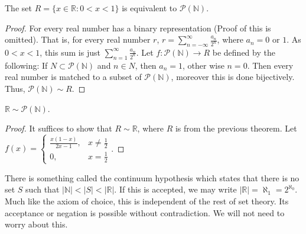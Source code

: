 \documentclass[crop=false,class=book]{standalone}
\begin{document}
\begin{theorem}
The set $R=\{x\in \mathbb{R}:0<x<1\}$ is equivalent to $\mathcal{P}(\mathbb{N})$.
\end{theorem}
\begin{proof}
For every real number has a binary representation (Proof of this is omitted). That is, for every real number $r$, $ r = \sum_{n=-\infty}^{\infty} \frac{a_n}{2^n}$, where $a_n = 0$ or $1$. As $0<x<1$, this sum is just $\sum_{n=1}^{\infty} \frac{a_n}{2^n}$. Let $f:\mathcal{P}(\mathbb{N})\rightarrow R$ be defined by the following: If $N\subset \mathcal{P}(\mathbb{N})$ and $n\in N$, then $a_n = 1$, other wise $n=0$. Then every real number is matched to a subset of $\mathcal{P}(\mathbb{N})$, moreover this is done bijectively. Thus, $\mathcal{P}(\mathbb{N})\sim R$.
\end{proof}
\begin{theorem}
$\mathbb{R} \sim \mathcal{P}(\mathbb{N})$.
\end{theorem}
\begin{proof}
It suffices to show that $R\sim \mathbb{R}$, where $R$ is from the previous theorem. Let $f(x) = \begin{cases} \frac{x(1-x)}{2x-1}, & x \ne \frac{1}{2} \\ 0, & x = \frac{1}{2}\end{cases}$.
\end{proof}
\begin{remark}
There is something called the continuum hypothesis which states that there is no set $S$ such that $|\mathbb{N}| < |S| < |\mathbb{R}|$. If this is accepted, we may write $|\mathbb{R}| = \aleph_1 = 2^{\aleph_0}$. Much like the axiom of choice, this is independent of the rest of set theory. Its acceptance or negation is possible without contradiction. We will not need to worry about this.
\end{remark}
\end{document}
